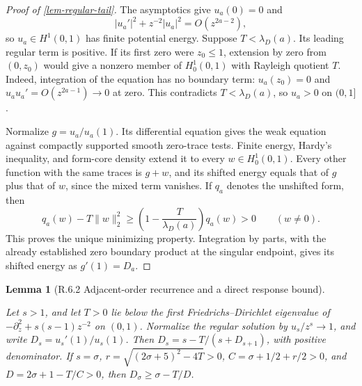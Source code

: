 \documentclass[11pt,a4paper]{article}
\theoremstyle{proofmanuscript}
\newtheorem{lemma}[theorem]{Lemma}
\begin{document}
\begin{proof}[Proof of \ref{lem-regular-tail}]
The asymptotics give \(u_a(0)=0\) and \[
|u_a'|^2+z^{-2}|u_a|^2=O(z^{2a-2}),
\] so \(u_a\in H^1(0,1)\) has finite potential energy. Suppose \(T<\lambda_D(a)\). Its leading regular term is positive. If its first zero were \(z_0\le1\), extension by zero from \((0,z_0)\) would give a nonzero member of \(H_0^1(0,1)\) with Rayleigh quotient \(T\). Indeed, integration of the equation has no boundary term: \(u_a(z_0)=0\) and \(u_au_a'=O(z^{2a-1})\to0\) at zero. This contradicts \(T<\lambda_D(a)\), so \(u_a>0\) on \((0,1]\).

Normalize \(g=u_a/u_a(1)\). Its differential equation gives the weak equation against compactly supported smooth zero-trace tests. Finite energy, Hardy's inequality, and form-core density extend it to every \(w\in H_0^1(0,1)\). Every other function with the same traces is \(g+w\), and its shifted energy equals that of \(g\) plus that of \(w\), since the mixed term vanishes. If \(q_a\) denotes the unshifted form, then \[
q_a(w)-T\|w\|_2^2
\ge\left(1-\frac{T}{\lambda_D(a)}\right)q_a(w)>0
\qquad(w\ne0).
\] This proves the unique minimizing property. Integration by parts, with the already established zero boundary product at the singular endpoint, gives its shifted energy as \(g'(1)=D_a\).

\end{proof}

\begin{lemma}[R.6.2 Adjacent-order recurrence and a direct response bound]\label{lem-tail-recurrence}

Let \(s>1\), and let \(T>0\) lie below the first Friedrichs--Dirichlet eigenvalue of \(-\partial_z^2+s(s-1)z^{-2}\) on \((0,1)\). Normalize the regular solution by \(u_s/z^s\to1\), and write \(D_s=u_s'(1)/u_s(1)\). Then \(D_s=s-T/(s+D_{s+1})\), with positive denominator. If \(s=\sigma\), \(r=\sqrt{(2\sigma+5)^2-4T}>0\), \(C=\sigma+1/2+r/2>0\), and \(D=2\sigma+1-T/C>0\), then \(D_\sigma\ge\sigma-T/D\).

\end{lemma}
\end{document}
